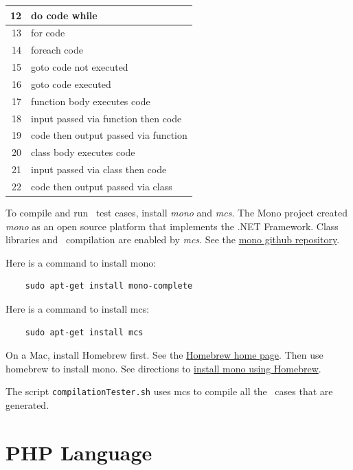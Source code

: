 \begin{appendices}
\begin{table}[H]
\begin{tabular}{|r|l|}
12 & do code while \\
\hline
13 & for code \\
\hline
14 & foreach code \\
\hline
15 & goto code not executed \\
\hline
16 & goto code executed \\
\hline
17 & function body executes code \\
\hline
18 & input passed via function then code \\
\hline
19 & code then output passed via function \\
\hline
20 & class body executes code \\
\hline
21 & input passed via class then code \\
\hline
22 & code then output passed via class \\
\hline
\end{tabular}
\label{tab:complexity IDs for CSharp}
\end{table}

\label{sec:run csharp}
To compile and run \CSharp\ test cases, install \emph{mono} and \emph{mcs}.
The Mono project created \emph{mono} as an open source platform that
implements the .NET Framework. Class libraries and \CSharp\ compilation are enabled
by \emph{mcs}. See the \href{http://github.com/mono/mono}{mono github repository}.

Here is a command to install mono:

\begin{verbatim}
    sudo apt-get install mono-complete
\end{verbatim}

Here is a command to install mcs:

\begin{verbatim}
    sudo apt-get install mcs
\end{verbatim}

On a Mac, install Homebrew first. See
the \href{https://brew.sh/}{Homebrew home page}.
Then use homebrew to install mono.  See directions to
\href{https://formulae.brew.sh/formula/mono}{install mono using Homebrew}.

The script \verb|compilationTester.sh| uses mcs to compile all the
\CSharp\ cases that are generated.

\section{PHP Language}
\label{sec:PHP language}


\end{appendices}
